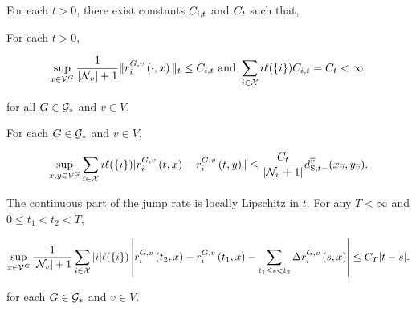 \begin{nassu}
\label{na::reg}

For each \(t>0\), there exist constants \(C_{i,t}\) and \(C_{t}\) such that,

\begin{subnassu}
\label{reg::bddr}

For each \(t>0\),

\[\sup_{\xf\in\valid\gind{G}} \frac{1}{|\neigh{v}|+1}\|\rate\gvpara{G}{v}\stpara{i}\tmepro{\cdot}{\xf}{}\|_t \leq \jumpibd{i}{t}\te{ and } \sum_{i\in\sta} i\Sm(\{i\})\jumpibd{i}{t} = \jumpbd{t} < \infty.\]

for all \(G\in \mathcal{G}_\ast\) and \(v\in V\). 
\end{subnassu}

\begin{subnassu}
\label{reg::liprx}
For each \(G \in \mathcal{G}_\ast\) and \(v \in V\), 

\[\sup_{\xf,\xg\in \valid\gind{G}} \sum_{i\in\sta}i\Sm(\{i\})|\rate\gvpara{G}{v}\stpara{i}\tmepro{t}{\xf}{} - \rate\gvpara{G}{v}\stpara{i}\tmepro{t}{\xg}{}| \leq \frac{\jumpbd{t}}{|\neigh{v}+1|}\stmet{t-}\vpara{\cl{v}}(\xf\vind{\cl{v}},\xg\vind{\cl{v}}).\]

\end{subnassu}

\begin{subnassu}
\label{reg::liprt}

The continuous part of the jump rate is locally Lipschitz in \(t\). For any \(T < \infty\) and \(0 \leq t_1 < t_2 < T\),

\[\sup_{\xf\in\valid\gind{G}} \frac{1}{|\neigh{v}|+1}\sum_{i\in\sta}|i|\Sm(\{i\})\left|\rate\gvpara{G}{v}\stpara{i}\tmepro{t_2}{\xf}{} - \rate\gvpara{G}{v}\stpara{i}\tmepro{t_1}{\xf}{} - \sum_{t_1\leq s < t_2} \Delta\rate\gvpara{G}{v}\stpara{i}\tmepro{s}{\xf}{}\right| \leq \jumpbd{T}|t-s|.\] 

for each \(G \in \mathcal{G}_\ast\) and \(v \in V\). 
\end{subnassu}




\end{nassu}
